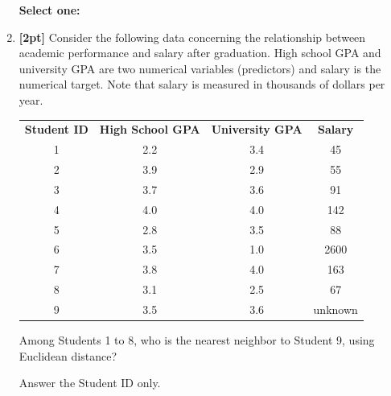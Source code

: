 \begin{enumerate}
    \textbf{Select one:}
    
 
    
    \newpage
    \item \textbf{[2pt]} Consider the following data concerning the relationship between academic performance and salary after graduation. High school GPA and university GPA are two numerical variables (predictors) and salary is the numerical target. Note that salary is measured in thousands of dollars per year.
    
    \begin{table}[H]
        \centering
        \begin{tabular}{cccc}
            \textbf{Student ID} & \textbf{High School GPA} & \textbf{University GPA} & \textbf{Salary} \\
            1 & 2.2 & 3.4 & 45 \\
            2 & 3.9 & 2.9 & 55 \\
            3 & 3.7 & 3.6 & 91 \\
            4 & 4.0 & 4.0 & 142 \\
            5 & 2.8 & 3.5 & 88 \\
            6 & 3.5 & 1.0 & 2600 \\
            7 & 3.8 & 4.0 & 163 \\
            8 & 3.1 & 2.5 & 67 \\
            9 & 3.5 & 3.6 & unknown \\
        \end{tabular}
        \label{tab:my_label}
    \end{table}
    
    Among Students 1 to 8, who is the nearest neighbor to Student 9, using Euclidean distance?
    
    Answer the Student ID only.

    \begin{tcolorbox}[fit,height=1cm, width=4cm, blank, borderline={1pt}{-2pt},nobeforeafter]
    \end{tcolorbox}


\end{enumerate}
